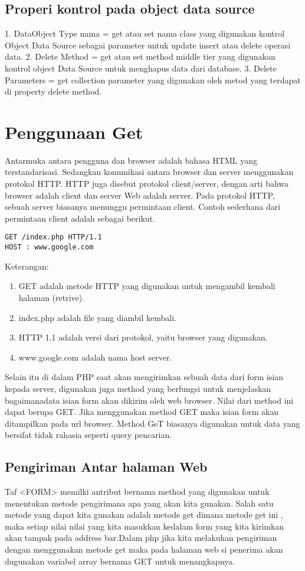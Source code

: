 \subsection{Properi kontrol pada object data source}
1.	DataObject Type nama = get atau set nama class yang digunakan kontrol Object Data Source sebagai parameter untuk update insert atau 
delete operasi data.
2.	Delete Method = get atau set method middle tier yang digunakan kontrol object Data Source untuk menghapus data dari database.
3.	Delete Parameters = get collection parameter yang digunakan oleh metod yang terdapat di property delete method.

\section{Penggunaan Get}
Antarmuka antara pengguna dan browser adalah bahasa HTML yang terstandarisasi. Sedangkan komunikasi antara browser dan server 
menggunakan protokol HTTP. HTTP juga disebut protokol client/server, dengan arti bahwa browser adalah client dan server Web adalah 
server. Pada protokol HTTP, sebuah server biasanya menunggu permintaan client. 
Contoh sederhana dari permintaan client adalah sebagai berikut.
\begin{verbatim}
GET /index.php HTTP/1.1
HOST : www.google.com
\end{verbatim}
Keterangan:
\begin{enumerate}
\item GET adalah metode HTTP yang digunakan untuk mengambil kembali halaman (retrive).
\item index.php adalah file yang diambil kembali.
\item HTTP 1.1 adalah versi dari protokol, yaitu browser yang digunakan.
\item www.google.com adalah nama host server.
\end{enumerate}
Selain itu di dalam PHP saat akan mengirimkan sebuah data dari form isian kepada server, digunakan juga method yang berfungsi untuk 
menjelaskan bagaimanadata isian form akan dikirim oleh web browser. Nilai dari method ini dapat berupa GET. 
Jika menggunakan method GET maka isian form akan ditampilkan pada url browser. Method GeT biasanya digunakan untuk data yang bersifat 
tidak rahasia seperti query pencarian. 

\subsection{Pengiriman Antar halaman Web}
Taf <FORM> memilki antribut bernama method yang digunakan untuk menentukan metode pengirimana apa yang akan kita gunakan. Salah satu 
metode yang dapat kita gunakan adalah metode get dimana metode get ini , maka setiap nilai nilai yang kita masukkan kedalam form yang 
kita kirimkan akan tampak pada address bar.Dalam php jika kita melakukan pengiriman dengan menggunakan metode get maka pada halaman web 
si penerima akan dugunakan variabel array bernama GET untuk menangkapnya.

